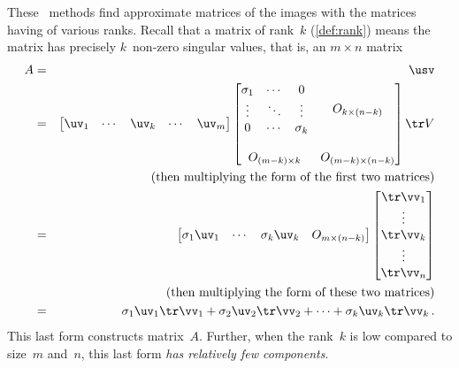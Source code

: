 These \svd\ methods find approximate matrices of the images with the matrices having of various ranks.
Recall that a matrix of rank~\(k\) (\autoref{def:rank}) means the matrix has precisely \(k\)~non-zero singular values, that is, an \(m\times n\) matrix
\begin{eqnarray*}
A&=&\usv
\\&=&
\begin{bmatrix} \uv_1&\cdots&\uv_k&\cdots&\uv_m \end{bmatrix}
\begin{bmatrix} \begin{matrix} \sigma_1&\cdots&0\\
\vdots&\ddots&\vdots\\
0&\cdots&\sigma_k \end{matrix} & 
O_{k\times (n-k)}\\\,\\
O_{(m-k)\times k}&O_{(m-k)\times (n-k)}\end{bmatrix}
\tr V
\\&&(\text{then multiplying the form of the first two matrices})
\\&=&
\begin{bmatrix} \sigma_1\uv_1&\cdots&\sigma_k\uv_k&O_{m\times(n-k)} \end{bmatrix}
\begin{bmatrix} \tr\vv_1\\\vdots\\\tr\vv_k\\\vdots\\\tr\vv_n \end{bmatrix}
\\&&(\text{then multiplying the form of these two matrices})
\\&=&
\sigma_1\uv_1\tr\vv_1+\sigma_2\uv_2\tr\vv_2+\cdots+\sigma_k\uv_k\tr\vv_k\,.
\end{eqnarray*}
This last form constructs matrix~\(A\).
Further, when the rank~\(k\) is low compared to size~\(m\) and~\(n\), this last form \emph{has relatively few components}.




